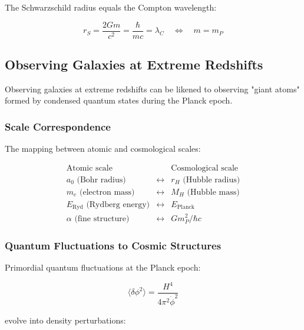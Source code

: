 The Schwarzschild radius equals the Compton wavelength:

\begin{equation}
\label{eq:planck_equality}
r_S = \frac{2Gm}{c^2} = \frac{\hbar}{mc} = \lambda_C \quad \Longleftrightarrow \quad m = m_P
\end{equation}

\subsection{Observing Galaxies at Extreme Redshifts}

Observing galaxies at extreme redshifts can be likened to observing "giant atoms" formed by condensed quantum states during the Planck epoch.

\subsubsection{Scale Correspondence}

The mapping between atomic and cosmological scales:

\begin{equation}
\label{eq:scale_mapping}
\begin{array}{rcl}
\text{Atomic scale} & & \text{Cosmological scale} \\
\hline
a_0 \text{ (Bohr radius)} & \longleftrightarrow & r_H \text{ (Hubble radius)} \\
m_e \text{ (electron mass)} & \longleftrightarrow & M_H \text{ (Hubble mass)} \\
E_{\text{Ryd}} \text{ (Rydberg energy)} & \longleftrightarrow & E_{\text{Planck}} \\
\alpha \text{ (fine structure)} & \longleftrightarrow & G m_P^2/\hbar c
\end{array}
\end{equation}

\subsubsection{Quantum Fluctuations to Cosmic Structures}

Primordial quantum fluctuations at the Planck epoch:

\begin{equation}
\label{eq:primordial_fluctuations}
\langle \delta\phi^2 \rangle = \frac{H^4}{4\pi^2 \dot{\phi}^2}
\end{equation}

evolve into density perturbations:

